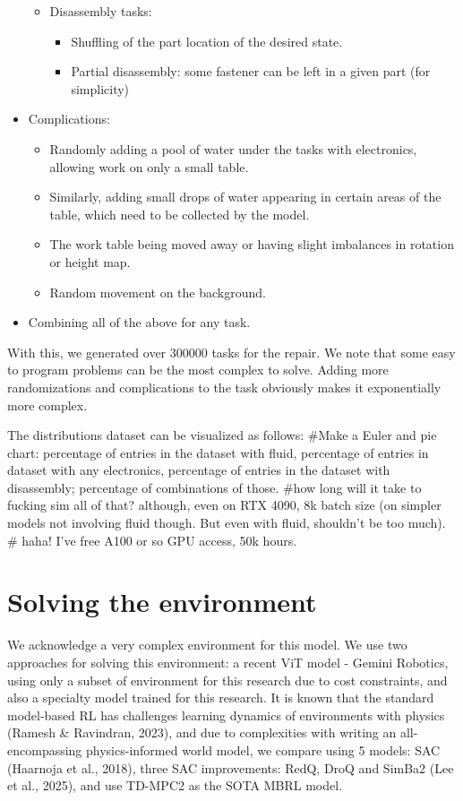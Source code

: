 \documentclass{article} %
\begin{document}
\begin{itemize}
\begin{itemize}
\begin{itemize}
    \end{itemize}
    \item Disassembly tasks:
    \begin{itemize}
        \item Shuffling of the part location of the desired state.
        \item Partial disassembly: some fastener can be left in a given part (for simplicity)
    \end{itemize}
\end{itemize}
\item Complications:
\begin{itemize}
    \item Randomly adding a pool of water under the tasks with electronics, allowing work on only a small table.
    \item Similarly, adding small drops of water appearing in certain areas of the table, which need to be collected by the model.
    \item The work table being moved away or having slight imbalances in rotation or height map.
    \item Random movement on the background.
\end{itemize}
\item Combining all of the above for any task.
\end{itemize}

With this, we generated over 300000 tasks for the repair.
We note that some easy to program problems can be the most complex to solve. Adding more randomizations and complications to the task obviously makes it exponentially more complex.

The distributions dataset can be visualized as follows: 
#Make a Euler and pie chart: percentage of entries in the dataset with fluid, percentage of entries in dataset with any electronics, percentage of entries in the dataset with disassembly; percentage of combinations of those.
#how long will it take to fucking sim all of that? although, even on RTX 4090, 8k batch size (on simpler models not involving fluid though. But even with fluid, shouldn't be too much). # haha! I've free A100 or so GPU access, 50k hours.

\section{Solving the environment}
We acknowledge a very complex environment for this model. We use two approaches for solving this environment: a recent ViT model - Gemini Robotics, using only a subset of environment for this research due to cost constraints, and also a specialty model trained for this research. It is known that the standard model-based RL has challenges learning dynamics of environments with physics (Ramesh \& Ravindran, 2023), and due to complexities with writing an all-encompassing physics-informed world model, we compare using 5 models: SAC (Haarnoja et al., 2018), three SAC improvements: RedQ, DroQ and SimBa2 (Lee et al., 2025), and use TD-MPC2 as the SOTA MBRL model. 
\end{document}
